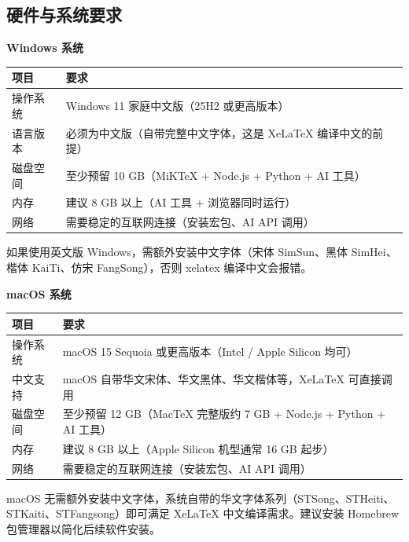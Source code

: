 \documentclass[12pt,a4paper]{ctexart}
\begin{document}
\subsection{硬件与系统要求}

\textbf{Windows 系统}

\begin{table}[H]
\centering
\begin{tabular}{lp{10cm}}
\toprule
\textbf{项目} & \textbf{要求} \\
\midrule
操作系统 & Windows 11 家庭中文版（25H2 或更高版本） \\
语言版本 & 必须为中文版（自带完整中文字体，这是 XeLaTeX 编译中文的前提） \\
磁盘空间 & 至少预留 10 GB（MiKTeX + Node.js + Python + AI 工具） \\
内存 & 建议 8 GB 以上（AI 工具 + 浏览器同时运行） \\
网络 & 需要稳定的互联网连接（安装宏包、AI API 调用） \\
\bottomrule
\end{tabular}
\end{table}

\begin{warningbox}[重要提示]
如果使用英文版 Windows，需额外安装中文字体（宋体 SimSun、黑体 SimHei、楷体 KaiTi、仿宋 FangSong），否则 xelatex 编译中文会报错。
\end{warningbox}

\textbf{macOS 系统}

\begin{table}[H]
\centering
\begin{tabular}{lp{10cm}}
\toprule
\textbf{项目} & \textbf{要求} \\
\midrule
操作系统 & macOS 15 Sequoia 或更高版本（Intel / Apple Silicon 均可） \\
中文支持 & macOS 自带华文宋体、华文黑体、华文楷体等，XeLaTeX 可直接调用 \\
磁盘空间 & 至少预留 12 GB（MacTeX 完整版约 7 GB + Node.js + Python + AI 工具） \\
内存 & 建议 8 GB 以上（Apple Silicon 机型通常 16 GB 起步） \\
网络 & 需要稳定的互联网连接（安装宏包、AI API 调用） \\
\bottomrule
\end{tabular}
\end{table}

\begin{notebox}
macOS 无需额外安装中文字体，系统自带的华文字体系列（STSong、STHeiti、STKaiti、STFangsong）即可满足 XeLaTeX 中文编译需求。建议安装 Homebrew 包管理器以简化后续软件安装。
\end{notebox}
\end{document}
